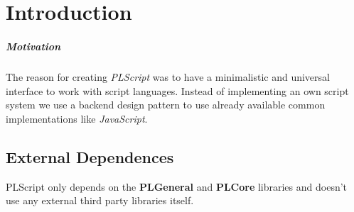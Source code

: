 \chapter{Introduction}


\paragraph{Motivation}
The reason for creating \emph{PLScript} was to have a minimalistic and universal interface to work with script languages. Instead of implementing an own script system we use a backend design pattern to use already available common implementations like \emph{JavaScript}.


\section{External Dependences}
PLScript only depends on the \textbf{PLGeneral} and \textbf{PLCore} libraries and doesn't use any external third party libraries itself.
